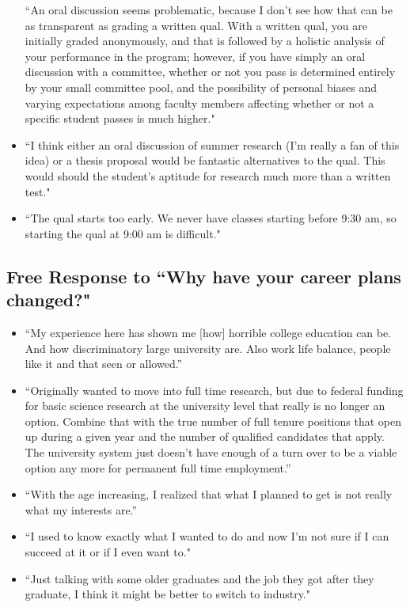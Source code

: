 \documentclass[oneside]{book}   %
\begin{document}
\begin{itemize}
``An oral discussion seems problematic, because I don't see how that can be as transparent as grading a written qual. With a written qual, you are initially graded anonymously, and that is followed by a holistic analysis of your performance in the program; however, if you have simply an oral discussion with a committee, whether or not you pass is determined entirely by your small committee pool, and the possibility of personal biases and varying expectations among faculty members affecting whether or not a specific student passes is much higher."
	\item ``I think either an oral discussion of summer research (I'm really a fan of this idea) or a thesis proposal would be fantastic alternatives to the qual. This would should the student's aptitude for research much more than a written test."
	\item ``The qual starts too early. We never have classes starting before 9:30 am, so starting the qual at 9:00 am is difficult."
\end{itemize}

\subsection{Free Response to ``Why have your career plans changed?"}

\begin{itemize}
	\item “My experience here has shown me [how] horrible college education can be. And how discriminatory large university are. Also work life balance, people like it and that seen or allowed.”
	\item “Originally wanted to move into full time research, but due to federal funding for basic science research at the university level that really is no longer an option. Combine that with the true number of full tenure positions that open up during a given year and the number of qualified candidates that apply. The university system just doesn't have enough of a turn over to be a viable option any more for permanent full time employment.”
	\item “With the age increasing, I realized that what I planned to get is not really what my interests are.”
	\item ``I used to know exactly what I wanted to do and now I'm not sure if I can succeed at it or if I even want to."
	\item ``Just talking with some older graduates and the job they got after they graduate, I think it might be better to switch to industry."
\end{itemize}
\end{document}
